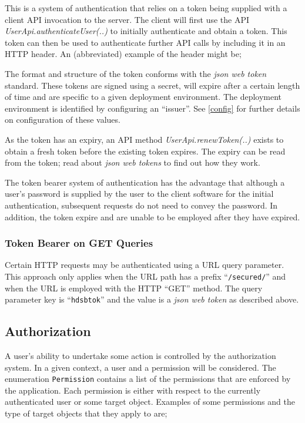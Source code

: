 This is a system of authentication that relies on a token being supplied with a client API invocation to the server.  The client will first use the API {\it UserApi.authenticateUser(..)} to initially authenticate and obtain a token.  This token can then be used to authenticate further API calls by including it in an HTTP header.  An (abbreviated) example of the header might be;


The format and structure of the token conforms with the {\it json web token} standard.  These tokens are signed using a secret, will expire after a certain length of time and are specific to a given deployment environment.  The deployment environment is identified by configuring an ``issuer''.  See \ref{config} for further details on configuration of these values.

As the token has an expiry, an API method {\it UserApi.renewToken(..)} exists to obtain a fresh token before the existing token expires.  The expiry can be read from the token; read about {\it json web tokens} to find out how they work.

The token bearer system of authentication has the advantage that although a user's password is supplied by the user to the client software for the initial authentication, subsequent requests do not need to convey the password.  In addition, the token expire and are unable to be employed after they have expired.

\subsubsection{Token Bearer on GET Queries}

Certain HTTP requests may be authenticated using a URL query parameter.  This approach only applies when the URL path has a prefix ``{\tt /secured/}'' and when the URL is employed with the HTTP ``GET'' method.  The query parameter key is ``{\tt hdsbtok}'' and the value is a {\it json web token} as described above.

\subsection{Authorization}

A user's ability to undertake some action is controlled by the authorization system.  In a given context, a user and a permission will be considered.  The enumeration {\tt Permission} contains a list of the permissions that are enforced by the application.  Each permission is either with respect to the currently authenticated user or some target object.  Examples of some permissions and the type of target objects that they apply to are;

